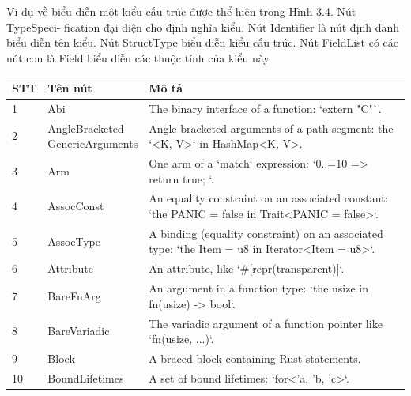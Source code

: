 Ví dụ về biểu diễn một kiểu cấu trúc được thể hiện trong Hình 3.4. Nút TypeSpeci-
fication đại diện cho định nghĩa kiểu. Nút Identifier là nút định danh biểu diễn tên kiểu.
Nút StructType biểu diễn kiểu cấu trúc. Nút FieldList có các nút con là Field biểu diễn các thuộc tính của kiểu này.

\footnotesize
\begin{longtable}{| p{} | p{} | p{} |}
\hline
\textbf{STT} & \textbf{Tên nút} & \textbf{Mô tả} \\ \hline
1     & Abi                            & The binary interface of a function: `extern "C"`.                                                              \\ \hline
2     & \makecell{AngleBracketed \\ GenericArguments} & Angle bracketed arguments of a path segment: the `<K, V>` in HashMap<K, V>.                                    \\ \hline
3     & Arm                            & One arm of a `match` expression: `0..=10 => { return true; }`.                                                 \\ \hline
4     & AssocConst                     & An equality constraint on an associated constant: `the PANIC = false in Trait<PANIC = false>`.                 \\ \hline
5     & AssocType                      & A binding (equality constraint) on an associated type: `the Item = u8 in Iterator<Item = u8>`.                 \\ \hline
6     & Attribute                      & An attribute, like `\#[repr(transparent)]`.                                                                     \\ \hline
7     & BareFnArg                      & An argument in a function type: `the usize in fn(usize) -> bool`.                                              \\ \hline
8     & BareVariadic                   & The variadic argument of a function pointer like `fn(usize, ...)`.                                             \\ \hline
9     & Block                          & A braced block containing Rust statements.                                                                     \\ \hline
10    & BoundLifetimes                 & A set of bound lifetimes: `for<'a, 'b, 'c>`.                                                                   \\ \hline

\end{longtable}
